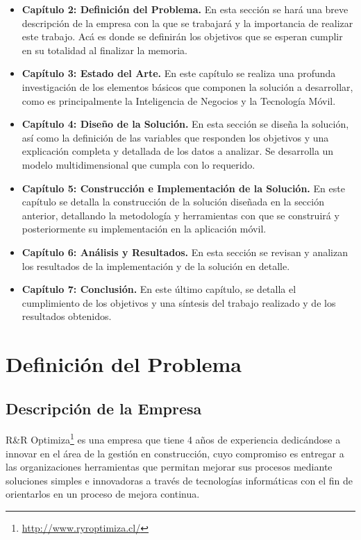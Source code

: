 \documentclass[letter,12pt,oneside]{report}
\begin{document}
\begin{itemize}
\item \textbf{Capítulo 2: Definición del Problema.} En esta sección se hará una breve descripción de la empresa con la que se trabajará y la importancia de realizar este trabajo. Acá es donde se definirán los objetivos que se esperan cumplir en su totalidad al finalizar la memoria.
\item \textbf{Capítulo 3: Estado del Arte.} En este capítulo se realiza una profunda investigación de los elementos básicos que componen la solución a desarrollar, como es principalmente la Inteligencia de Negocios y la Tecnología Móvil.
\item \textbf{Capítulo 4: Diseño de la Solución.} En esta sección se diseña la solución, así como la definición de las variables que responden los objetivos y una explicación completa y detallada de los datos a analizar. Se desarrolla un modelo multidimensional que cumpla con lo requerido.
\item \textbf{Capítulo 5: Construcción e Implementación de la Solución.} En este capítulo se detalla la construcción de la solución diseñada en la sección anterior, detallando la metodología y herramientas con que se construirá y posteriormente su implementación en la aplicación móvil.
\item \textbf{Capítulo 6: Análisis y Resultados.} En esta sección se revisan y analizan los resultados de la implementación y de la solución en detalle.
\item \textbf{Capítulo 7: Conclusión.} En este último capítulo, se detalla el cumplimiento de los objetivos y una síntesis del trabajo realizado y de los resultados obtenidos.
\end{itemize}

\newpage
{}
\thispagestyle{fancyplain}
\chapter{Definición del Problema}

\section{Descripción de la Empresa}
R\&R Optimiza\footnote{\url{http://www.ryroptimiza.cl/}} es una empresa que tiene 4 años de experiencia dedicándose a innovar en el área de la gestión en construcción, cuyo compromiso es entregar a las organizaciones herramientas que permitan mejorar sus procesos mediante soluciones simples e innovadoras a través de tecnologías informáticas con el fin de orientarlos en un proceso de mejora continua.
\end{document}
